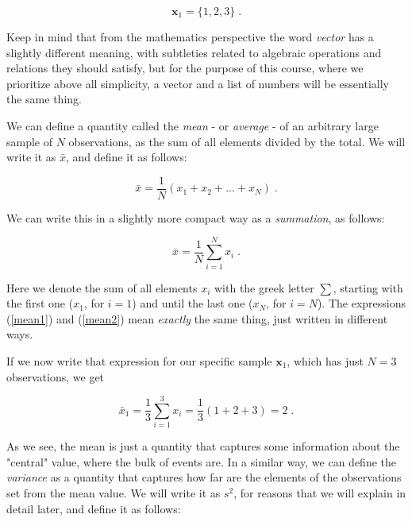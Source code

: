 \documentclass{book}
\begin{document}
\begin{equation}
	\textbf{x}_{1} = \{1, 2, 3\} \; . \nonumber  
\end{equation}

Keep in mind that from the mathematics perspective the word \textit{vector} has a slightly different meaning, with subtleties related to algebraic operations and relations they should satisfy, but for the purpose of this course, where we prioritize above all simplicity, a vector and a list of numbers will be essentially the same thing.

\medskip

We can define a quantity called the \textit{mean} - or \textit{average} - of an arbitrary large sample of $N$ observations, as the sum of all elements divided by the total. We will write it as $\bar{x}$, and define it as follows:

\begin{equation}
	\bar{x} = \frac{1}{N} (x_{1} + x_{2} + ... + x_{N}) \; .
	\label{mean1}
\end{equation}

We can write this in a slightly more compact way as a \textit{summation}, as follows:

\begin{equation}
	\bar{x} = \frac{1}{N} \sum_{i = 1}^{N} x_{i} \; .
	\label{mean2}
\end{equation}

Here we denote the sum of all elements $x_{i}$ with the greek letter $\sum$, starting with the first one ($x_1$, for $i = 1$) and until the last one ($x_N$, for $i = N$). The expressions (\ref{mean1}) and (\ref{mean2}) mean \textit{exactly} the same thing, just written in different ways.

\medskip

If we now write that expression for our specific sample $\textbf{x}_{1}$, which has just $N = 3$ observations, we get

\begin{equation}
	\bar{x}_{1} = \frac{1}{3} \sum_{i = 1}^{3} x_{i} = \frac{1}{3} (1 + 2 + 3) = 2 \; . \nonumber
\end{equation}

As we see, the mean is just a quantity that captures some information about the "central" value, where the bulk of events are. In a similar way, we can define the \textit{variance} as a quantity that captures how far are the elements of the observations set from the mean value. We will write it as $s^2$, for reasons that we will explain in detail later, and define it as follows:
\end{document}
